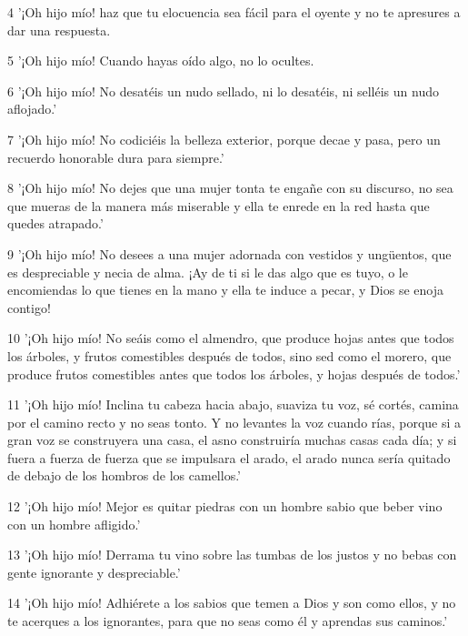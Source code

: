 \par 4 '¡Oh hijo mío! haz que tu elocuencia sea fácil para el oyente y no te apresures a dar una respuesta.

\par 5 '¡Oh hijo mío! Cuando hayas oído algo, no lo ocultes.

\par 6 '¡Oh hijo mío! No desatéis un nudo sellado, ni lo desatéis, ni selléis un nudo aflojado.'

\par 7 '¡Oh hijo mío! No codiciéis la belleza exterior, porque decae y pasa, pero un recuerdo honorable dura para siempre.'

\par 8 '¡Oh hijo mío! No dejes que una mujer tonta te engañe con su discurso, no sea que mueras de la manera más miserable y ella te enrede en la red hasta que quedes atrapado.'

\par 9 '¡Oh hijo mío! No desees a una mujer adornada con vestidos y ungüentos, que es despreciable y necia de alma. ¡Ay de ti si le das algo que es tuyo, o le encomiendas lo que tienes en la mano y ella te induce a pecar, y Dios se enoja contigo!

\par 10 '¡Oh hijo mío! No seáis como el almendro, que produce hojas antes que todos los árboles, y frutos comestibles después de todos, sino sed como el morero, que produce frutos comestibles antes que todos los árboles, y hojas después de todos.'

\par 11 '¡Oh hijo mío! Inclina tu cabeza hacia abajo, suaviza tu voz, sé cortés, camina por el camino recto y no seas tonto. Y no levantes la voz cuando rías, porque si a gran voz se construyera una casa, el asno construiría muchas casas cada día; y si fuera a fuerza de fuerza que se impulsara el arado, el arado nunca sería quitado de debajo de los hombros de los camellos.'

\par 12 '¡Oh hijo mío! Mejor es quitar piedras con un hombre sabio que beber vino con un hombre afligido.'

\par 13 '¡Oh hijo mío! Derrama tu vino sobre las tumbas de los justos y no bebas con gente ignorante y despreciable.'

\par 14 '¡Oh hijo mío! Adhiérete a los sabios que temen a Dios y son como ellos, y no te acerques a los ignorantes, para que no seas como él y aprendas sus caminos.'

